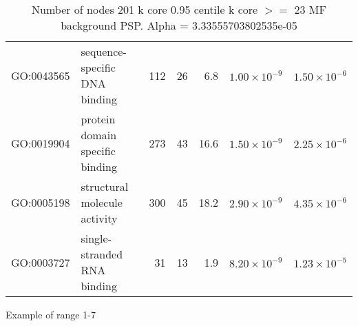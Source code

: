 \begin{table}[ht]
\begin{tabular}{llrrrrr}
  GO:0043565 & sequence-specific DNA binding & 112 & 26 & 6.8 & $1.00 \times 10^{-9}$ & $1.50 \times 10^{-6}$ \\ 
  GO:0019904 & protein domain specific binding & 273 & 43 & 16.6 & $1.50 \times 10^{-9}$ & $2.25 \times 10^{-6}$ \\ 
  GO:0005198 & structural molecule activity & 300 & 45 & 18.2 & $2.90 \times 10^{-9}$ & $4.35 \times 10^{-6}$ \\ 
  GO:0003727 & single-stranded RNA binding & 31 & 13 & 1.9 & $8.20 \times 10^{-9}$ & $1.23 \times 10^{-5}$ \\ 
   \hline
\end{tabular}
\caption{Number of nodes 201 k core 0.95 centile  k core $>=$ 23 MF background PSP. Alpha = 3.33555703802535e-05} 
\label{tab:Number of nodes 201 k core 0.95 centile  k core $>=$ 23 MF background PSP. Alpha = 3.33555703802535e-05}
\end{table}

Example of range 1-7

